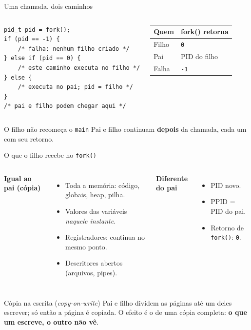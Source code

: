 \documentclass[aspectratio=169]{beamer}
\begin{document}
\begin{frame}[fragile]{Uma chamada, dois caminhos}
\begin{columns}[T]
\begin{lstlisting}[style=codigo]
pid_t pid = fork();
if (pid == -1) {
    /* falha: nenhum filho criado */
} else if (pid == 0) {
    /* este caminho executa no filho */
} else {
    /* executa no pai; pid = filho */
}
/* pai e filho podem chegar aqui */
\end{lstlisting}

\begin{center}
\begin{tabular}{@{}ll@{}}
\toprule
\textbf{Quem} & \textbf{fork() retorna} \\
\midrule
Filho & \texttt{0} \\
Pai   & PID do filho \\
Falha & \texttt{-1} \\
\bottomrule
\end{tabular}
\end{center}
\end{columns}

\vspace{0.6em}
\begin{alertblock}{O filho não recomeça o \texttt{main}}
Pai e filho continuam \textbf{depois} da chamada, cada um com seu retorno.
\end{alertblock}
\end{frame}

\begin{frame}{O que o filho recebe no \texttt{fork()}}
\begin{columns}[T]
\textbf{Igual ao pai (cópia)}
\begin{itemize}
    \item Toda a memória: código, globais, heap, pilha.
    \item Valores das variáveis \emph{naquele instante}.
    \item Registradores: continua no mesmo ponto.
    \item Descritores abertos (arquivos, pipes).
\end{itemize}

\textbf{Diferente do pai}
\begin{itemize}
    \item PID novo.
    \item PPID = PID do pai.
    \item Retorno de \texttt{fork()}: \texttt{0}.
\end{itemize}
\end{columns}

\vspace{0.6em}
\begin{exampleblock}{Cópia na escrita (\emph{copy-on-write})}
Pai e filho dividem as páginas até um deles escrever; só então a página é copiada. O efeito é o de uma cópia completa: \textbf{o que um escreve, o outro não vê}.
\end{exampleblock}
\end{frame}
\end{document}
